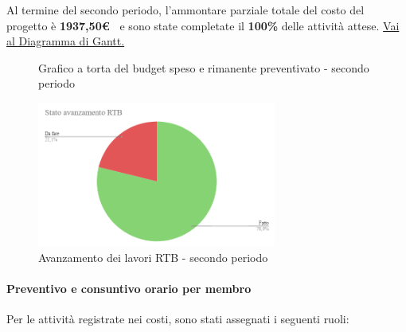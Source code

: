 Al termine del secondo periodo, l'ammontare parziale totale del costo del progetto è \textbf{ 1937,50\euro\ } e sono state completate il \textbf{100\%} delle attività attese.
\href{https://github.com/orgs/ByteOps-swe/projects/3/views/1?sortedBy%5Bdirection%5D=asc&sortedBy%5BcolumnId%5D=64182560}{Vai al Diagramma di Gantt.}


\begin{figure}[H]
    \centering
    \begin{minipage}[b]{0.45\textwidth}
        \centering
        \caption{Grafico a torta del budget speso e rimanente preventivato - secondo periodo}
        \label{fig:Budget_speso_2}
    \end{minipage}
    
    \vspace{1cm}

    \begin{minipage}[b]{0.70\textwidth}
        \centering
        \includegraphics[width=0.7\textwidth]{../Images/avanzamento2Periodo.png}
        \caption{Avanzamento dei lavori RTB - secondo periodo}
        \label{fig:Avanzamento_RTB_2}
    \end{minipage}
\end{figure}

\paragraph{Preventivo e consuntivo orario per membro}
Per le attività registrate nei costi, sono stati assegnati i seguenti ruoli:

